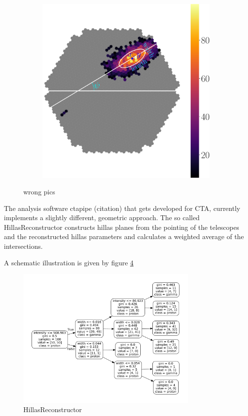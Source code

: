 \begin{figure}
\begin{subfigure}{0.3\textwidth}
        \label{fig:2}
    \end{subfigure}
    \begin{subfigure}{0.3\textwidth}
        \includegraphics[width=0.9\linewidth]{Plots/hillas_cleaned_params.pdf} 
        \label{fig:1}
    \end{subfigure}
    \caption{wrong pics}
    \label{fig:disp_magic}
\end{figure}



The analysis software ctapipe (citation) that gets developed for
CTA, currently implements a slightly different, geometric approach.
The so called HillasReconstructor constructs hillas planes
from the pointing of the telescopes and the reconstructed hillas parameters
and calculates a weighted average of the intersections.

A schematic illustration is given by figure \ref{fig:hillas_reco}

\begin{figure}
    \centering
    \includegraphics[width=0.8\textwidth]{Plots/decision_tree.pdf}
    \caption{HillasReconstructor}
    \label{fig:hillas_reco}
\end{figure}

